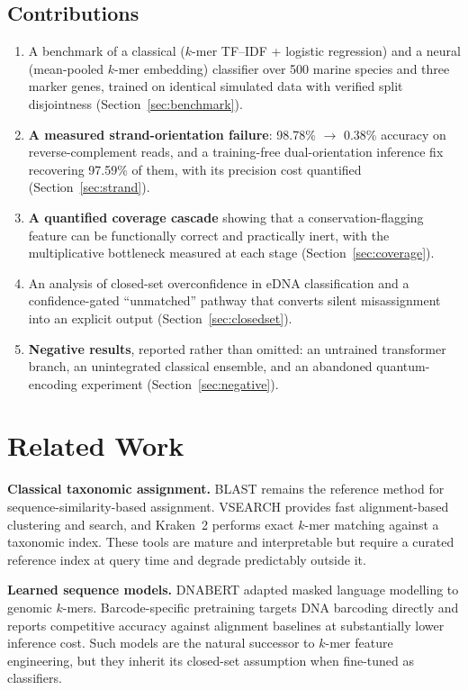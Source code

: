 \documentclass[conference]{IEEEtran}
\begin{document}
\subsection*{Contributions}
\begin{enumerate}
\item A benchmark of a classical ($k$-mer TF--IDF + logistic regression)
      and a neural (mean-pooled $k$-mer embedding) classifier over 500
      marine species and three marker genes, trained on identical
      simulated data with verified split disjointness
      (Section~\ref{sec:benchmark}).
\item \textbf{A measured strand-orientation failure}: 98.78\%
      $\rightarrow$ 0.38\% accuracy on reverse-complement reads, and a
      training-free dual-orientation inference fix recovering 97.59\% of
      them, with its precision cost quantified
      (Section~\ref{sec:strand}).
\item \textbf{A quantified coverage cascade} showing that a
      conservation-flagging feature can be functionally correct and
      practically inert, with the multiplicative bottleneck measured at
      each stage (Section~\ref{sec:coverage}).
\item An analysis of closed-set overconfidence in eDNA classification and a
      confidence-gated ``unmatched'' pathway that converts silent
      misassignment into an explicit output (Section~\ref{sec:closedset}).
\item \textbf{Negative results}, reported rather than omitted: an untrained
      transformer branch, an unintegrated classical ensemble, and an
      abandoned quantum-encoding experiment (Section~\ref{sec:negative}).
\end{enumerate}

\section{Related Work}

\textbf{Classical taxonomic assignment.} BLAST \cite{blast} remains the
reference method for sequence-similarity-based assignment. VSEARCH
\cite{vsearch} provides fast alignment-based clustering and search, and
Kraken~2 \cite{kraken2} performs exact $k$-mer matching against a taxonomic
index. These tools are mature and interpretable but require a curated
reference index at query time and degrade predictably outside it.

\textbf{Learned sequence models.} DNABERT \cite{dnabert} adapted masked
language modelling to genomic $k$-mers. Barcode-specific pretraining
\cite{barcodebert} targets DNA barcoding directly and reports competitive
accuracy against alignment baselines at substantially lower inference cost.
Such models are the natural successor to $k$-mer feature engineering, but
they inherit its closed-set assumption when fine-tuned as classifiers.
\end{document}
